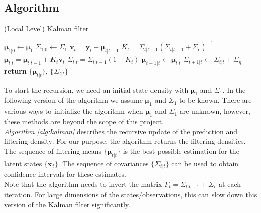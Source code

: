 \documentclass[11pt, oneside]{scrreprt}   	%
\begin{document}
\subsection{Algorithm}
\begin{algorithm}[h!]
\caption{(Local Level) Kalman filter}
\label{alg:kalman}
  \begin{algorithmic}[1]
      \smallskip
      \State $\boldsymbol{\mu}_{1 | 0}\gets \boldsymbol{\mu}_1$
      \State $\Sigma_{1 | 0}\gets \Sigma_1$
      \smallskip
      	\State $\boldsymbol{v}_t = \boldsymbol{y}_t - \boldsymbol{\mu}_{t | t-1}$
      	\State $K_t = \Sigma_{t | t-1} (\Sigma_{t | t-1} + \Sigma_{\epsilon})^{-1}$
	\smallskip
      	\State $\boldsymbol{\mu}_{t | t} = \boldsymbol{\mu}_{t | t-1} + K_t \boldsymbol{v}_t$
      	\State $\Sigma_{t | t} = \Sigma_{t | t-1}(1 - K_t)$
	\smallskip
      	\State $\boldsymbol{\mu}_{t+1 | t}\gets \boldsymbol{\mu}_{t | t}$
      	\State $\Sigma_{t+1 | t}\gets \Sigma_{t | t} + \Sigma_{\eta}$
      \EndFor
      \State \textbf{return} $\{\boldsymbol{\mu}_{t | t}\}$, $\{\Sigma_{t | t}\}$
    \EndProcedure
  \end{algorithmic}
\end{algorithm}
To start the recursion, we need an initial state density with $\boldsymbol{\mu}_1$ and $\Sigma_1$. In the following version of the algorithm we assume $\boldsymbol{\mu}_1$ and $\Sigma_1$ to be known. There are various ways to initialize the algorithm when $\boldsymbol{\mu}_1$ and $\Sigma_1$ are unknown, however, these methods are beyond the scope of this project.\\

\textit{Algorithm \ref{alg:kalman}} describes the recursive update of the prediction and filtering density.  For our purpose, the algorithm returns the filtering densities. 
The sequence of filtering means $\{\boldsymbol{\mu}_{t | t}\}$ is the best possible estimation for the latent states $\{\boldsymbol{x}_t\}$. 
The sequence of covariances $\{\Sigma_{t | t}\}$ can be used to obtain confidence intervals for these estimates. \\  

Note that the algorithm needs to invert the matrix $F_t = \Sigma_{t | t-1} + \Sigma_{\epsilon}$ at each iteration. For large dimensions of the states/observations, this can slow down this version of the Kalman filter significantly.
\end{document}
